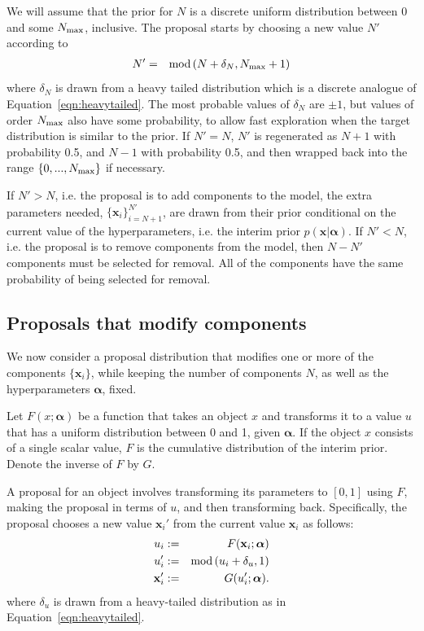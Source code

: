 \documentclass[letterpaper, 11pt]{article}
\newcommand{\hyperparams}{\boldsymbol{\alpha}}
\newcommand{\xx}{\mathbf{x}}
\begin{document}
We will assume that the prior for $N$ is a discrete uniform distribution
between 0 and some $N_{\rm max}$, inclusive. The proposal starts by choosing
a new value $N'$ according to
\begin{eqnarray}
N' &=& \textnormal{mod}\left(N + \delta_N, N_{\rm max} + 1\right)
\end{eqnarray}
where $\delta_N$ is drawn from a heavy tailed
distribution which is a discrete analogue of Equation~\ref{eqn:heavytailed}.
The most probable values of $\delta_N$ are $\pm 1$, but values
of order $N_{\rm max}$ also have some probability, to allow fast exploration
when the target distribution is similar to the prior. If $N' = N$, $N'$ is
regenerated as $N+1$ with probability 0.5, and $N-1$ with probability 0.5,
and then wrapped back into the range $\{0,...,N_{\rm max}\}$ if necessary.

If $N' > N$, i.e. the proposal is to add components to the model,
the extra parameters needed, $\{\xx_i\}_{i=N+1}^{N'}$,
are drawn from their prior conditional on the current value of the
hyperparameters, i.e. the interim prior $p(\xx | \hyperparams)$.
If $N' < N$, i.e. the proposal is to remove components from the model,
then $N - N'$ components must be selected for removal. All
of the components have the same probability of being selected for removal.

\subsection{Proposals that modify components}\label{sec:proposal2}
We now consider a proposal distribution that modifies one or more of the
components $\{\xx_i\}$, while keeping the number of components $N$, as well as the
hyperparameters $\hyperparams$, fixed.

Let $F(x; \hyperparams)$ be a function that takes an object $x$ and transforms it
to a value $u$ that has a uniform distribution between 0 and 1, given $\hyperparams$.
If the object $x$ consists of a single scalar value, $F$ is the cumulative
distribution of the interim prior. Denote the inverse of $F$ by $G$.

A proposal
for an object involves transforming its parameters to $[0, 1]$ using $F$,
making the proposal in terms of $u$, and then transforming back.
Specifically, the proposal chooses
a new value $\xx_i'$ from the current value $\xx_i$ as follows:
\begin{eqnarray}
u_i &:=& F(\xx_i; \hyperparams)\\
u_i' &:=& \textnormal{mod}\left(u_i + \delta_u, 1\right)\\
\xx_i' &:=& G(u_i'; \hyperparams).
\end{eqnarray}
where $\delta_u$ is drawn from a heavy-tailed distribution as in
Equation~\ref{eqn:heavytailed}.
\end{document}
